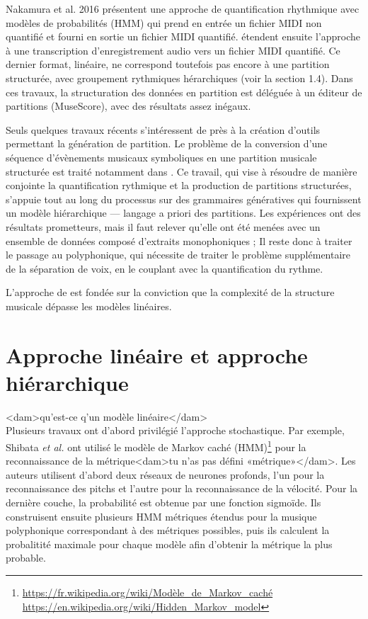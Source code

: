 Nakamura et al. 2016 présentent une approche de quantification rhythmique avec
modèles de probabilités (HMM) qui prend en entrée un fichier MIDI non quantifié
et fourni en sortie un fichier MIDI quantifié. \cite{SHIBATA2021262} étendent
ensuite l'approche à une transcription d'enregistrement audio vers un fichier
MIDI quantifié. Ce dernier format, linéaire, ne correspond toutefois pas encore
à une partition structurée,  avec groupement rythmiques hérarchiques (voir la
section 1.4). Dans ces travaux, la structuration des données en partition est
déléguée à un éditeur de partitions (MuseScore), avec des résultats assez
inégaux.

Seuls quelques travaux récents s’intéressent de près à la création d’outils
permettant la génération de partition. Le problème de la conversion d'une
séquence d'évènements musicaux symboliques en une partition musicale structurée
est traité notamment dans \cite{foscarin:hal-01988990}. Ce travail, qui vise à
résoudre de manière conjointe la quantification rythmique et la production de
partitions structurées, s’appuie tout au long du processus sur des grammaires
génératives qui fournissent un modèle hiérarchique — langage a priori des
partitions. Les expériences ont des résultats prometteurs, mais il faut relever
qu’elle ont été menées avec un ensemble de données composé d'extraits
monophoniques ; Il reste donc à traiter le passage au polyphonique, qui
nécessite de traiter le problème supplémentaire de la séparation de voix,
en le couplant avec la quantification du rythme.

L'approche de \cite{foscarin:hal-01988990} est fondée sur la conviction 
que la complexité de la structure musicale dépasse les modèles linéaires.

\section{Approche linéaire et approche hiérarchique}
<dam>qu'est-ce q'un modèle linéaire</dam>\\

Plusieurs travaux ont d’abord privilégié l’approche stochastique. Par exemple,
Shibata \textit{et al.} \cite{SHIBATA2021262} ont utilisé le modèle de Markov
caché (HMM)\footnote{
\url{https://fr.wikipedia.org/wiki/Modèle_de_Markov_caché}\\
\url{https://en.wikipedia.org/wiki/Hidden_Markov_model}} pour la reconnaissance
de la métrique<dam>tu n’as pas défini «métrique»</dam>. Les auteurs utilisent
d’abord deux réseaux de neurones profonds, l’un pour la reconnaissance des
pitchs et l’autre pour la reconnaissance de la vélocité. 
Pour la dernière couche, la probabilité est obtenue par une fonction sigmoïde.
Ils construisent ensuite plusieurs HMM métriques étendus pour la musique
polyphonique correspondant à des métriques possibles, puis ils calculent la
probalitité maximale pour chaque modèle afin d’obtenir la métrique la plus
probable.


